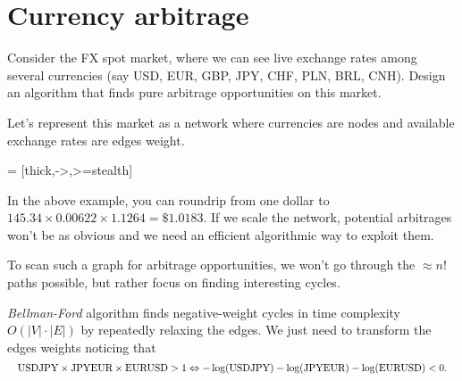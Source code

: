 \section{Currency arbitrage}

\begin{tcolorbox}[width=\linewidth, sharp corners=all, colback=white!95!black]
    Consider the FX spot market, where we can see live exchange rates among several currencies (say USD, EUR, GBP, JPY, CHF, PLN, BRL, CNH). Design an algorithm that finds pure arbitrage opportunities on this market.
\end{tcolorbox}

Let's represent this market as a network where currencies are nodes and available exchange rates are edges weight.

 = [thick,->,>=stealth]
\begin{figure}[h]
    \centering
\end{figure}

In the above example, you can roundrip from one dollar to $145.34\times0.00622\times1.1264=\$1.0183$. If we scale the network, potential arbitrages won't be as obvious and we need an efficient algorithmic way to exploit them.

To scan such a graph for arbitrage opportunities, we won't go through the $\approx n!$ paths possible, but rather focus on finding interesting cycles.

\textit{Bellman-Ford} algorithm finds negative-weight cycles in time complexity $O(\lvert V \rvert \cdot \lvert E \rvert)$ by repeatedly relaxing the edges. We just need to transform the edges weights noticing that 
\begin{equation*}
    \resizebox{\hsize}{!}{$\text{USDJPY} \times \text{JPYEUR} \times \text{EURUSD} > 1 \Leftrightarrow -\log(\text{USDJPY}) -\log(\text{JPYEUR}) -\log(\text{EURUSD}) < 0.$}
\end{equation*}


